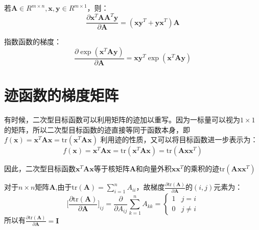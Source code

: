\documentclass[10pt,a4paper,UTF8]{article}
\begin{document}
\begin{tikzinstance}
若\(\mathbf{A}\in R^{m\times n},\mathbf{x},\mathbf{y}\in R^{m\times 1}\)，则：
\begin{equation}
\label{eq:33}
\frac{\partial \mathbf{x}^{T}\mathbf{A}\mathbf{A}^{T}\mathbf{y}}{\partial \mathbf{A}} =  (\mathbf{x}\mathbf{y}^{T} + \mathbf{y}\mathbf{x}^{T})\mathbf{A}
\end{equation}
\end{tikzinstance}

\begin{tikzinstance}
指数函数的梯度：
\begin{equation}
\label{eq:34}
\frac{\partial \exp(\mathbf{x}^{T}\mathbf{A}\mathbf{y})}{\partial \mathbf{A}} = \mathbf{x}\mathbf{y}^{T} \exp(\mathbf{x}^{T}\mathbf{A}\mathbf{y})
\end{equation}
\end{tikzinstance}

\section{迹函数的梯度矩阵}
\label{sec:orgba1bc8d}


有时候，二次型目标函数可以利用矩阵的迹加以重写。因为一标量可以视为\(1\times 1\)的矩阵，所以二次型目标函数的迹直接等同于函数本身，即\(f(\mathbf{x}) = \mathbf{x}^{T}\mathbf{A}\mathbf{x} = \mathrm{tr}(\mathbf{x}^{T}\mathbf{A}\mathbf{x})\) 利用迹的性质，又可以将目标函数进一步表示为：
\begin{equation}
\label{eq:35}
f(\mathbf{x}) = \mathbf{x}^{T}\mathbf{A}\mathbf{x} = \mathrm{tr}(\mathbf{x}^{T}\mathbf{A}\mathbf{x}) = \mathrm{tr}(\mathbf{A}\mathbf{x}\mathbf{x}^{T})
\end{equation}

因此，二次型目标函数\(\mathbf{x}^{T}\mathbf{A}\mathbf{x}\)等于核矩阵\(\mathbf{A}\)和向量外积\(\mathbf{x}\mathbf{x}^{T}\)的乘积的迹\(\mathrm{tr}(\mathbf{A}\mathbf{x}\mathbf{x}^{T})\)

\begin{tikzinstance}


对于\(n\times n\)矩阵\(\mathbf{A}\),由于\(\mathrm{tr}(\mathbf{A}) = \sum_{i=1}^{n}A_{ii}\)，故梯度\(\frac{\partial \mathrm{tr}(\mathbf{A})}{\partial \mathbf{A}}\)的\((i,j)\)元素为：
\begin{equation}
\label{eq:37}
\bigg[\frac{\partial \mathrm{tr}(\mathbf{A})}{\partial \mathbf{A}} \bigg]_{ij} = \frac{\partial}{\partial A_{ij}}\sum_{k=1}^{n}A_{kk} =
\begin{cases}
1 & j=i \\
0 & j\neq i
\end{cases}
\end{equation}
所以有\(\frac{\partial \mathrm{tr}(\mathbf{A})}{\partial \mathbf{A}} = \mathbf{I}\)
\end{tikzinstance}
\end{document}
